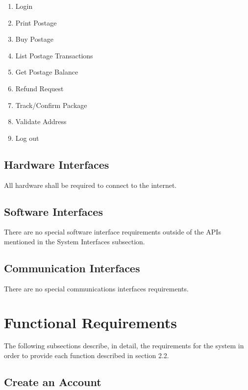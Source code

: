 \documentclass{scrreprt}
\begin{document}
\begin{enumerate}
\item Login
\item Print Postage
\item Buy Postage
\item List Postage Transactions
\item Get Postage Balance
\item Refund Request
\item Track/Confirm Package
\item Validate Address
\item Log out
\end{enumerate}

\subsection{Hardware Interfaces}

All hardware shall be required to connect to the internet.

\subsection{Software Interfaces}

There are no special software interface requirements outside of the 
APIs mentioned in the System Interfaces subsection.

\subsection{Communication Interfaces}

There are no special communications interfaces requirements.

\section{Functional Requirements}

The following subsections describe, in detail, the requirements for 
the system in order to provide each function described in section 
2.2.

\subsection{Create an Account}
\end{document}
